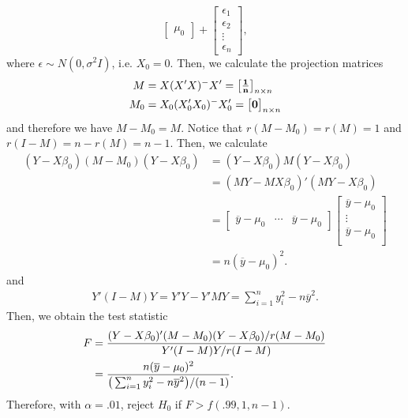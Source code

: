 \documentclass[11pt]{article}
\begin{document}
\begin{itemize}
\[\begin{bmatrix}
\mu_0
\end{bmatrix} + \begin{bmatrix}
\epsilon_1 \\ \epsilon_2 \\ \vdots \\ \epsilon_n
\end{bmatrix},
\]
where $\epsilon \sim N(0,\sigma^2I)$, i.e. $X_0 = 0$.  Then, we calculate the projection matrices
\begin{align*}
M &= X(X'X)^-X' = \begin{bmatrix}
{\bf \frac{1}{n}}
\end{bmatrix}_{n\times n} \\
M_0 &= X_0(X_0'X_0)^-X_0' = \begin{bmatrix}
{\bf 0}
\end{bmatrix}_{n\times n}
\end{align*}
and therefore we have $M-M_0 = M$.  Notice that $r(M-M_0) = r(M) = 1$ and $r(I-M) = n - r(M) = n-1$.  Then, we calculate
\begin{align*}
(Y-X\beta_0)(M-M_0)(Y-X\beta_0) &= (Y-X\beta_0)M(Y-X\beta_0) \\
&= (MY-MX\beta_0)'(MY-X\beta_0) \\
&= \begin{bmatrix}
\overline{y}-\mu_0 & \cdots &\overline{y}-\mu_0
\end{bmatrix}\begin{bmatrix}
\overline{y}-\mu_0 \\ \vdots \\ \overline{y}-\mu_0 \\
\end{bmatrix} \\
&= n(\overline{y}-\mu_0)^2.
\end{align*}
and
\begin{align*}
Y'(I-M)Y = Y'Y - Y'MY = \sum_{i=1}^n y_i^2 - n\overline{y}^2.
\end{align*}
Then, we obtain the test statistic
\begin{align*}
F &= \frac{(Y-X\beta_0)'(M-M_0)(Y-X\beta_0)/r(M-M_0)}{Y'(I-M)Y/r(I-M)} \\
&= \frac{n(\overline{y} - \mu_0)^2}{\big{(}\sum_{i=1}^ny_i^2 - n\overline{y}^2\big{)} / (n-1)}.
\end{align*}
Therefore, with $\alpha = .01$, reject $H_0$ if $F > f(.99, 1, n-1)$.

\end{itemize}
\end{document}
